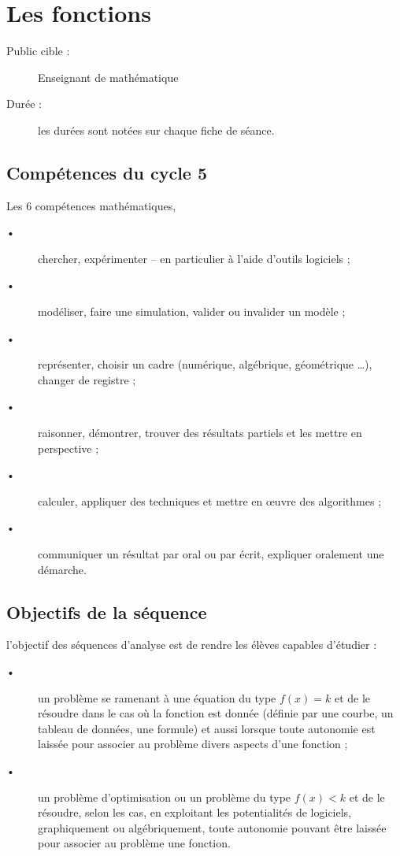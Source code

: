 

\section{Les fonctions}


\begin{description}
\item[Public cible :] Enseignant de mathématique
\item[Durée :] les durées sont notées sur chaque fiche de séance.
\end{description}

\subsection{Compétences du cycle 5}

Les 6 compétences mathématiques, 

\begin{description}
\item[•] chercher, expérimenter – en particulier à l'aide d'outils logiciels ;
\item[•] modéliser, faire une simulation, valider ou invalider un modèle ;
\item[•] représenter, choisir un cadre (numérique, algébrique, géométrique …), changer de registre ;
\item[•] raisonner, démontrer, trouver des résultats partiels et les mettre en perspective ;
\item[•] calculer, appliquer des techniques et mettre en œuvre des algorithmes ;
\item[•] communiquer un résultat par oral ou par écrit, expliquer oralement une démarche.
\end{description}


\subsection{Objectifs de la séquence}

l'objectif des séquences d'analyse est de rendre les élèves capables d'étudier :

\begin{description}
\item[•]  un problème se ramenant à une équation du type $f(x)=k$ et de le résoudre dans le cas où la fonction est donnée (définie par une courbe, un tableau de données, une formule) et aussi lorsque toute autonomie est laissée pour associer au problème divers aspects d’une fonction ;
\item[•]  un problème d'optimisation ou un problème du type $f(x)< k$ et de le résoudre, selon les cas, en exploitant les potentialités de logiciels, graphiquement ou algébriquement, toute autonomie pouvant être laissée pour associer au problème une fonction.
\end{description}


